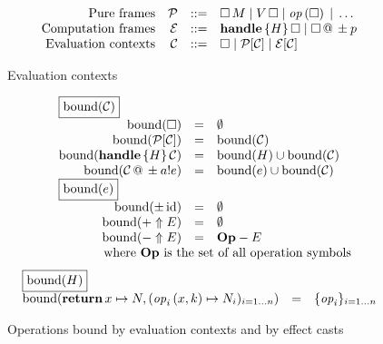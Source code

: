 \begin{figure}
\[
\begin{array}{rrcl}
 \text{Pure frames} & \xP  & \ruledef & \app{\square}{M} \rulealt \app{V}{\square} \rulealt \perform{\effop}{\square} \rulealt \dots \\
 \text{Computation frames} & \xE & \ruledef & \handle{H}{\square} \rulealt \cast{\square}{\pm p} \\
 \text{Evaluation contexts} & \xC & \ruledef & \square \rulealt \xP[\xC] \rulealt \xE[\xC]
\end{array}
\]
\caption{Evaluation contexts}
\end{figure}

\begin{figure}
\[
\begin{array}{rcl}
\multicolumn{3}{l}{\fbox{$\bound{\xC}$}} \\
  \bound{\square} & = & \emptyset \\
  \bound{\context{\xP}{\xC}} & = & \bound{\xC} \\
  \bound{\handle{H}{\xC}} & = & \bound{H} \cup \bound{\xC} \\
  \bound{\cast{\xC}{\pm \cty{e}{a}}} & = & \bound{e} \cup \bound{\xC} \\
\multicolumn{3}{l}{\fbox{$\bound{e}$}} \\
  \bound{\pm\, \cid} & = & \emptyset \\
  \bound{+ \Uparrow E} & = & \emptyset \\
  \bound{- \Uparrow E} & = & \mathbf{Op} - E \\
  && \quad \makebox[0pt]{\text{where $\mathbf{Op}$ is the set of all operation symbols} }
\end{array}
\]
\[
\begin{array}{rcl}
\multicolumn{3}{l}{\fbox{$\bound{H}$}} \\
  \bound{\treturn{x}\mapsto N, \fori{i}{n}{\perform{\effop_i}{x,k} \mapsto N_i}}
    &=& \foriset{i}{n}{\effop_i}
\end{array}
\]
\caption{Operations bound by evaluation contexts and by effect casts}
\end{figure}

